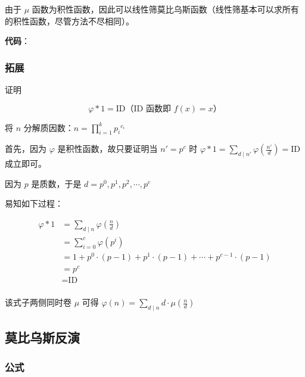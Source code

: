 由于 $\mu$ 函数为积性函数，因此可以线性筛莫比乌斯函数（线性筛基本可以求所有的积性函数，尽管方法不尽相同）。

\textbf{代码}：


\subsubsection{拓展}

证明

$$
\varphi*1=\text{ID}\text{（ID 函数即 } f(x)=x\text{）}
$$

将 $n$ 分解质因数：$\displaystyle n=\prod_{i=1}^k {p_i}^{c_i}$

首先，因为 $\varphi$ 是积性函数，故只要证明当 $n'=p^c$ 时 $\displaystyle\varphi*1=\sum_{d\mid n'}\varphi(\frac{n'}{d})=\text{ID}$ 成立即可。

因为 $p$ 是质数，于是 $d=p^0,p^1,p^2,\cdots,p^c$

易知如下过程：

$$
\begin{aligned}
\varphi*1&=\sum_{d\mid n}\varphi(\frac{n}{d})\\
&=\sum_{i=0}^c\varphi(p^i)\\
&=1+p^0\cdot(p-1)+p^1\cdot(p-1)+\cdots+p^{c-1}\cdot(p-1)\\
&=p^c\\
&=\text{ID}\\
\end{aligned}
$$

该式子两侧同时卷 $\mu$ 可得 $\displaystyle\varphi(n)=\sum_{d\mid n}d\cdot\mu(\frac{n}{d})$

\hr

\subsection{莫比乌斯反演}

\subsubsection{公式}

